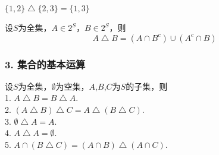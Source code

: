 \documentclass{beamer}
\begin{document}
\begin{CJK*}{UTF8}{gbsn}
\begin{frame}
\begin{minipage}{0.29\linewidth}
  \end{minipage}\pause
    \begin{Ex}
        $\{1,2\} \bigtriangleup \{2,3\} = \{1,3\}$
      \end{Ex}
      \pause
      \begin{Thm}
        设$S$为全集，$A\in 2^S$，$B\in 2^S$，则
        \begin{equation*}
          A \bigtriangleup B = (A \cap B^c)\cup (A^c \cap B)
        \end{equation*}
      \end{Thm}
\end{frame}

\begin{frame}
  \frametitle{3. 集合的基本运算}
  \begin{Thm}
设$S$为全集，$\emptyset$为空集，$A$,$B$,$C$为$S$的子集，则\\
1. $A \bigtriangleup B = B \bigtriangleup A$.\\
2. $(A \bigtriangleup B) \bigtriangleup C = A \bigtriangleup (B \bigtriangleup C)$.\\
3. $\emptyset \bigtriangleup A = A$.\\
4. $A \bigtriangleup A = \emptyset$.\\
5. $A \cap (B \bigtriangleup C) = (A \cap B) \bigtriangleup (A \cap C)$.\\ 
  \end{Thm}
\end{frame}




\end{CJK*}
\end{document}
